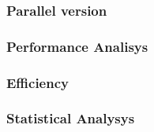 %



%
%
%
%

\subsubsection*{Parallel version}
\subsubsection*{Performance Analisys} 
\subsubsection*{Efficiency} 
\subsubsection*{Statistical Analysys}